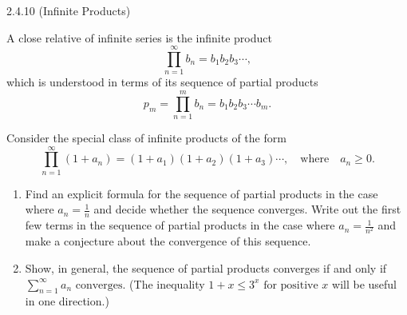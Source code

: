 \begin{exercise}
    {2.4.10 (Infinite Products)}

    A close relative of infinite series is the infinite product
    \[
    \prod_{n=1}^{\infty} b_n = b_1 b_2 b_3 \cdots,
    \]
    which is understood in terms of its sequence of partial products
    \[
    p_m = \prod_{n=1}^{m} b_n = b_1 b_2 b_3 \cdots b_m.
    \]

    Consider the special class of infinite products of the form
    \[
    \prod_{n=1}^{\infty} (1 + a_n) = (1 + a_1)(1 + a_2)(1 + a_3) \cdots, \quad \text{where} \quad a_n \geq 0.
    \]

    \begin{enumerate}
    \item Find an explicit formula for the sequence of partial products in the case where \( a_n = \frac{1}{n} \) and decide whether the sequence converges. Write out the first few terms in the sequence of partial products in the case where \( a_n = \frac{1}{n^2} \) and make a conjecture about the convergence of this sequence.
    \item Show, in general, the sequence of partial products converges if and only if \(\sum_{n=1}^{\infty} a_n \text{ converges.}\)
    (The inequality \(1 + x \leq 3^{x} \text{ for positive } x\) will be useful in one direction.)
    \end{enumerate}
\end{exercise}

